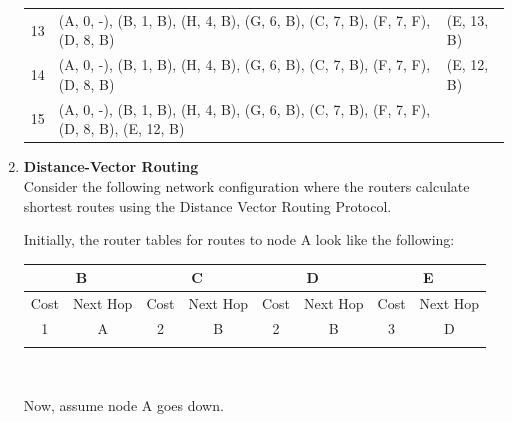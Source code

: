 \documentclass[10pt, a4paper]{article}
\begin{document}
\begin{enumerate}
{\begin{tabular}{lll}
            13 & (A, 0, -), (B, 1, B), (H, 4, B), (G, 6, B), (C, 7, B), (F, 7, F), (D, 8, B) & (E, 13, B)\\
            14 & (A, 0, -), (B, 1, B), (H, 4, B), (G, 6, B), (C, 7, B), (F, 7, F), (D, 8, B) & (E, 12, B)\\
            15 & (A, 0, -), (B, 1, B), (H, 4, B), (G, 6, B), (C, 7, B), (F, 7, F), (D, 8, B), (E, 12, B) & \\
            \bottomrule
        \end{tabular}
    }
    \color{black}
\item\mbox{}\textbf{Distance-Vector Routing}\\
    Consider the following network configuration where the routers calculate shortest routes using the Distance Vector Routing Protocol.
    \begin{center}
    \end{center}
    Initially, the router tables for routes to node A look like the following:\\
    \begin{center}
        \begin{tabular}{|c|c|c|c|c|c|c|c|}
            \hline
            \multicolumn{2}{|c|}{B} & \multicolumn{2}{|c|}{C} & \multicolumn{2}{|c|}{D} & \multicolumn{2}{|c|}{E}\\
            \hline
            Cost & Next Hop & Cost & Next Hop & Cost & Next Hop & Cost & Next Hop\\
            \hline
            1 & A & 2 & B & 2 & B & 3 & D\\
            \hline
            & & & & & & & \\
            \hline
        \end{tabular}\\
    \end{center}
    Now, assume node A goes down.\\


\end{enumerate}
\end{document}
